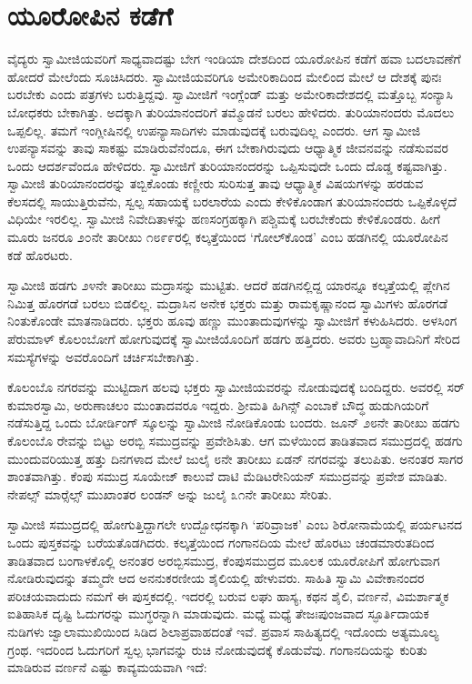 
\chapter{ಯೂರೋಪಿನ ಕಡೆಗೆ }

 ವೈದ್ಯರು ಸ್ವಾಮೀಜಿಯವರಿಗೆ ಸಾಧ್ಯವಾದಷ್ಟು ಬೇಗ ಇಂಡಿಯಾ ದೇಶದಿಂದ ಯೂರೋಪಿನ ಕಡೆಗೆ ಹವಾ ಬದಲಾವಣೆಗೆ ಹೋದರೆ ಮೇಲೆಂದು ಸೂಚಿಸಿದರು. ಸ್ವಾಮೀಜಿಯವರಿಗೂ ಅಮೇರಿಕಾದಿಂದ ಮೇಲಿಂದ ಮೇಲೆ ಆ ದೇಶಕ್ಕೆ ಪುನಃ ಬರಬೇಕು ಎಂದು ಪತ್ರಗಳು ಬರುತ್ತಿದ್ದವು. ಸ್ವಾಮೀಜಿಗೆ ಇಂಗ್ಲೆಂಡ್ ಮತ್ತು ಅಮೇರಿಕಾದೇಶದಲ್ಲಿ ಮತ್ತೊಬ್ಬ ಸಂನ್ಯಾಸಿ ಬೋಧಕರು ಬೇಕಾಗಿತ್ತು. ಅದಕ್ಕಾಗಿ ತುರಿಯಾನಂದರಿಗೆ ತಮ್ಮೊಡನೆ ಬರಲು ಹೇಳಿದರು. ತುರಿಯಾನಂದರು ಮೊದಲು ಒಪ್ಪಲಿಲ್ಲ. ತಮಗೆ ಇಂಗ್ಲೀಷಿನಲ್ಲಿ ಉಪನ್ಯಾಸಾದಿಗಳು ಮಾಡುವುದಕ್ಕೆ ಬರುವುದಿಲ್ಲ ಎಂದರು. ಆಗ ಸ್ವಾಮೀಜಿ ಉಪನ್ಯಾಸವನ್ನು ತಾವು ಸಾಕಷ್ಟು ಮಾಡಿರುವೆನೆಂದೂ, ಈಗ ಬೇಕಾಗಿರುವುದು ಆಧ್ಯಾತ್ಮಿಕ ಜೀವನವನ್ನು ನಡೆಸುವವರ ಒಂದು ಆದರ್ಶವೆಂದೂ ಹೇಳಿದರು. ಸ್ವಾಮೀಜಿಗೆ ತುರಿಯಾನಂದರನ್ನು ಒಪ್ಪಿಸುವುದೇ ಒಂದು ದೊಡ್ಡ ಕಷ್ಟವಾಗಿತ್ತು. ಸ್ವಾಮೀಜಿ ತುರಿಯಾನಂದರನ್ನು ತಬ್ಬಿಕೊಂಡು ಕಣ್ಣೀರು ಸುರಿಸುತ್ತ ತಾವು ಆಧ್ಯಾತ್ಮಿಕ ವಿಷಯಗಳನ್ನು ಹರಡುವ ಕೆಲಸದಲ್ಲಿ ಸಾಯುತ್ತಿರುವೆನು, ಸ್ವಲ್ಪ ಸಹಾಯಕ್ಕೆ ಬರಲಾರೆಯ ಎಂದು ಕೇಳಿಕೊಂಡಾಗ ತುರಿಯಾನಂದರು ಒಪ್ಪಿಕೊಳ್ಳದೆ ವಿಧಿಯೇ ಇರಲಿಲ್ಲ. ಸ್ವಾಮೀಜಿ ನಿವೇದಿತಾಳನ್ನು ಹಣಸಂಗ್ರಹಕ್ಕಾಗಿ ಪಶ್ಚಿಮಕ್ಕೆ ಬರಬೇಕೆಂದು ಕೇಳಿಕೊಂಡರು. ಹೀಗೆ ಮೂರು ಜನರೂ ೨೦ನೇ ತಾರೀಖು ೧೮೯೯ರಲ್ಲಿ ಕಲ್ಕತ್ತೆಯಿಂದ ‘ಗೋಲ್‍ಕೊಂಡ’ ಎಂಬ ಹಡಗಿನಲ್ಲಿ ಯೂರೋಪಿನ ಕಡೆ ಹೊರಟರು. 

 ಸ್ವಾಮೀಜಿ ಹಡಗು ೨೪ನೇ ತಾರೀಖು ಮದ್ರಾಸನ್ನು ಮುಟ್ಟಿತು. ಆದರೆ ಹಡಗಿನಲ್ಲಿದ್ದ ಯಾರನ್ನೂ ಕಲ್ಕತ್ತೆಯಲ್ಲಿ ಪ್ಲೇಗಿನ ನಿಮಿತ್ತ ಹೊರಗಡೆ ಬರಲು ಬಿಡಲಿಲ್ಲ. ಮದ್ರಾಸಿನ ಅನೇಕ ಭಕ್ತರು ಮತ್ತು ರಾಮಕೃಷ್ಣಾನಂದ ಸ್ವಾಮಿಗಳು ಹೊರಗಡೆ ನಿಂತುಕೊಂಡೇ ಮಾತನಾಡಿದರು. ಭಕ್ತರು ಹೂವು ಹಣ್ಣು ಮುಂತಾದುವುಗಳನ್ನು ಸ್ವಾಮೀಜಿಗೆ ಕಳುಹಿಸಿದರು. ಅಳಸಿಂಗ ಪೆರುಮಾಳ್ ಕೊಲಂಬೋಗೆ ಹೋಗುವುದಕ್ಕೆ ಸ್ವಾಮೀಜಿಯೊಂದಿಗೆ ಹಡಗು ಹತ್ತಿದರು. ಅವರು ಬ್ರಹ್ಮಾವಾದಿನಿಗೆ ಸೇರಿದ ಸಮಸ್ಯೆಗಳನ್ನು ಅವರೊಂದಿಗೆ ಚರ್ಚಿಸಬೇಕಾಗಿತ್ತು. 

 ಕೊಲಂಬೊ ನಗರವನ್ನು ಮುಟ್ಟಿದಾಗ ಹಲವು ಭಕ್ತರು ಸ್ವಾಮೀಜಿಯವರನ್ನು ನೋಡುವುದಕ್ಕೆ ಬಂದಿದ್ದರು. ಅವರಲ್ಲಿ ಸರ್ ಕುಮಾರಸ್ವಾಮಿ, ಅರುಣಾಚಲಂ ಮುಂತಾದವರೂ ಇದ್ದರು. ಶ‍್ರೀಮತಿ ಹಿಗಿನ್ಸ್ ಎಂಬಾಕೆ ಬೌದ್ಧ ಹುಡುಗಿಯರಿಗೆ ನಡೆಸುತ್ತಿದ್ದ ಒಂದು ಬೋರ್ಡಿಂಗ್ ಸ್ಕೂಲನ್ನು ಸ್ವಾಮೀಜಿ ನೋಡಿಕೊಂಡು ಬಂದರು. ಜೂನ್ ೨೮ನೇ ತಾರೀಖು ಹಡಗು ಕೊಲಂಬೊ ರೇವನ್ನು ಬಿಟ್ಟು ಅರಬ್ಬಿ ಸಮುದ್ರವನ್ನು ಪ್ರವೇಶಿಸಿತು. ಆಗ ಮಳೆಯಿಂದ ತಾಡಿತವಾದ ಸಮುದ್ರದಲ್ಲಿ ಹಡಗು ಮುಂದುವರಿಯುತ್ತ ಹತ್ತು ದಿನಗಳಾದ ಮೇಲೆ ಜುಲೈ ೮ನೇ ತಾರೀಖು ಏಡನ್ ನಗರವನ್ನು ತಲುಪಿತು. ಅನಂತರ ಸಾಗರ ಶಾಂತವಾಗಿತ್ತು. ಕೆಂಪು ಸಮುದ್ರ ಸೂಯೇಜ್ ಕಾಲುವೆ ದಾಟಿ ಮೆಡಿಟರೇನಿಯನ್ ಸಮುದ್ರವನ್ನು ಪ್ರವೇಶ ಮಾಡಿತು. ನೇಪಲ್ಸ್ ಮಾರ್‍ಸೆಲ್ಸ್ ಮುಖಾಂತರ ಲಂಡನ್ ಅನ್ನು ಜುಲೈ ೩೧ನೇ ತಾರೀಖು ಸೇರಿತು. 

 ಸ್ವಾಮೀಜಿ ಸಮುದ್ರದಲ್ಲಿ ಹೋಗುತ್ತಿದ್ದಾಗಲೇ ಉದ್ಬೋಧನಕ್ಕಾಗಿ ‘ಪರಿವ್ರಾಜಕ’ ಎಂಬ ಶಿರೋನಾಮೆಯಲ್ಲಿ ಪರ್ಯಟನದ ಒಂದು ಪುಸ್ತಕವನ್ನು ಬರೆಯತೊಡಗಿದರು. ಕಲ್ಕತ್ತೆಯಿಂದ ಗಂಗಾನದಿಯ ಮೇಲೆ ಹೊರಟು ಚಂಡಮಾರುತದಿಂದ ತಾಡಿತವಾದ ಬಂಗಾಳಕೊಲ್ಲಿ ಅನಂತರ ಅರಬ್ಬಿಸಮುದ್ರ, ಕೆಂಪುಸಮುದ್ರದ ಮೂಲಕ ಯೂರೋಪಿಗೆ ಹೋಗುವಾಗ ನೋಡಿರುವುದನ್ನು ತಮ್ಮದೇ ಆದ ಅನನುಕರಣೀಯ ಶೈಲಿಯಲ್ಲಿ ಹೇಳುವರು. ಸಾಹಿತಿ ಸ್ವಾಮಿ ವಿವೇಕಾನಂದರ ಪರಿಚಯವಾದುದು ನಮಗೆ ಈ ಪುಸ್ತಕದಲ್ಲಿ. ಇದರಲ್ಲಿ ಬರುವ ಲಘು ಹಾಸ್ಯ, ಕಥನ ಶೈಲಿ, ವರ್ಣನೆ, ವಿಮರ್ಶಾತ್ಮಕ ಐತಿಹಾಸಿಕ ದೃಷ್ಟಿ ಓದುಗರನ್ನು ಮುಗ್ಧರನ್ನಾಗಿ ಮಾಡುವುದು. ಮಧ್ಯೆ ಮಧ್ಯೆ ತೇಜಃಪುಂಜವಾದ ಸ್ಫೂರ್ತಿದಾಯಕ ನುಡಿಗಳು ಜ್ವಾಲಾಮುಖಿಯಿಂದ ಸಿಡಿದ ಶಿಲಾಪ್ರವಾಹದಂತೆ ಇವೆ. ಪ್ರವಾಸ ಸಾಹಿತ್ಯದಲ್ಲಿ ಇದೊಂದು ಅತ್ಯಮೂಲ್ಯ ಗ್ರಂಥ. ಇದರಿಂದ ಓದುಗರಿಗೆ ಸ್ವಲ್ಪ ಭಾಗವನ್ನು ರುಚಿ ನೋಡುವುದಕ್ಕೆ ಕೊಡುವೆವು. ಗಂಗಾನದಿಯನ್ನು ಕುರಿತು ಮಾಡಿರುವ ವರ್ಣನೆ ಎಷ್ಟು ಕಾವ್ಯಮಯವಾಗಿ ಇದೆ: 

